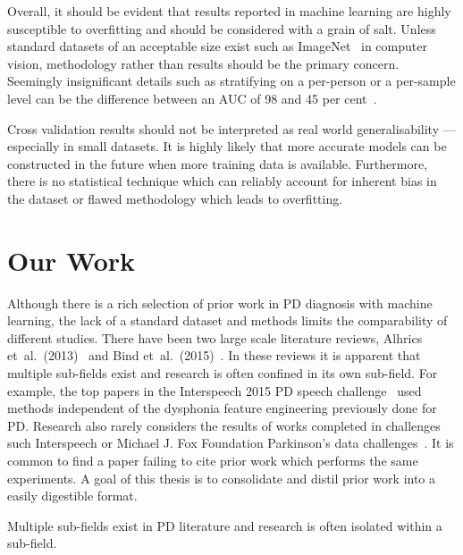 \documentclass[12pt, twoside]{book}
\begin{document}
Overall, it should be evident that results reported in machine learning are highly susceptible to overfitting and should be considered with a grain of salt. Unless standard datasets of an acceptable size exist such as ImageNet~\cite{imagenet} in computer vision, methodology rather than results should be the primary concern. Seemingly insignificant details such as stratifying on a per-person or a per-sample level can be the difference between an AUC of 98 and 45 per cent~\cite{mpowerneto2017analysis}. 

Cross validation results should not be interpreted as real world generalisability --- especially in small datasets. It is highly likely that more accurate models can be constructed in the future when more training data is available. Furthermore, there is no statistical technique which can reliably account for inherent bias in the dataset or flawed methodology which leads to overfitting.





\chapter{Our Work}
\label{ourwork}
Although there is a rich selection of prior work in PD diagnosis with machine learning, the lack of a standard dataset and methods limits the comparability of different studies. There have been two large scale literature reviews, Alhrics et~al.~(2013)~\cite{review2013} and Bind et~al.~(2015)~\cite{review2015}. In these reviews it is apparent that multiple sub-fields exist and research is often confined in its own sub-field. For example, the top papers in the Interspeech 2015 PD speech challenge~\cite{compareis15pd} used methods independent of the dysphonia feature engineering previously done for PD. Research also rarely considers the results of works completed in challenges such Interspeech or Michael J. Fox Foundation Parkinson's data challenges~\cite{mjfoxchallenge2013}. It is common to find a paper failing to cite prior work which performs the same experiments. A goal of this thesis is to consolidate and distil prior work into a easily digestible format. 

\begin{highlight}
Multiple sub-fields exist in PD literature and research is often isolated within a sub-field.
\end{highlight}
\end{document}
